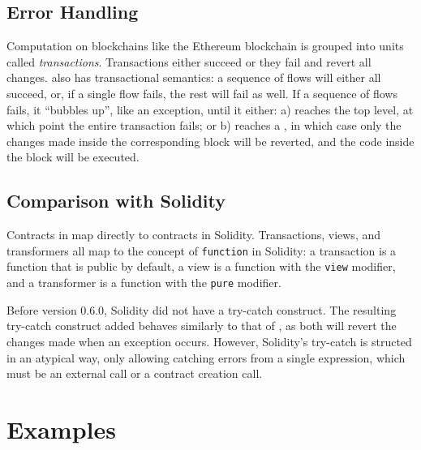 \documentclass[dvipsnames, usenames, sigconf]{acmart}
\begin{document}

\subsection{Error Handling}
Computation on blockchains like the Ethereum blockchain is grouped into units called \emph{transactions}.
Transactions either succeed or they fail and revert all changes.
\langName also has transactional semantics: a sequence of flows will either all succeed, or, if a single flow fails, the rest will fail as well.
If a sequence of flows fails, it ``bubbles up'', like an exception, until it either: a) reaches the top level, at which point the entire transaction fails; or b) reaches a , in which case only the changes made inside the corresponding  block will be reverted, and the code inside the  block will be executed.

\subsection{Comparison with Solidity}
Contracts in \langName map directly to contracts in Solidity.
Transactions, views, and transformers all map to the concept of \lstinline{function} in Solidity: a transaction is a function that is public by default, a view is a function with the \lstinline{view} modifier, and a transformer is a function with the \lstinline{pure} modifier.

Before version 0.6.0, Solidity did not have a try-catch construct.
The resulting try-catch construct added behaves similarly to that of \langName, as both will revert the changes made when an exception occurs.
However, Solidity's try-catch is structed in an atypical way, only allowing catching errors from a single expression, which must be an external call or a contract creation call.

\section{Examples}
\end{document}
